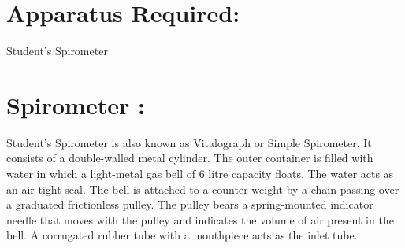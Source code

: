 \documentclass[a4paper,12pt]{book}
\begin{document}
															\section*{Apparatus Required:}
															Student’s Spirometer
															\section*{Spirometer :}
															Student’s Spirometer is also known as Vitalograph or Simple Spirometer. It consists of a double-walled metal cylinder. The outer container is filled with water in which a light-metal gas bell of 6 litre capacity floats. The water acts as an air-tight seal. The bell is attached to a counter-weight by a chain passing over a graduated frictionless pulley. The pulley bears a spring-mounted indicator needle that moves with the pulley and indicates the volume of air present in the bell. A corrugated rubber tube with a mouthpiece acts as the inlet tube.
\end{document}
